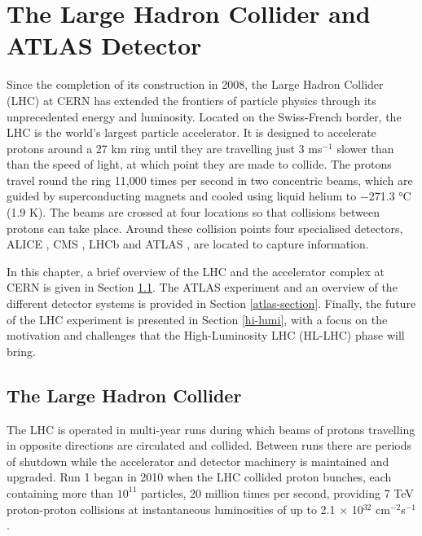 \graphicspath{{\subfix{../images/}}}
\doublespacing

\chapter{The Large Hadron Collider and ATLAS Detector}
\label{chapter-2}

Since the completion of its construction in 2008, the Large Hadron Collider (LHC)\cite{Evans:2008zzb} at CERN has extended the frontiers of particle physics through its unprecedented energy and luminosity. Located on the Swiss-French border, the LHC is the world’s largest particle accelerator. It is designed to accelerate protons around a 27 km ring until they are travelling just 3 ms$^{-1}$ slower than than the speed of light, at which point they are made to collide. The protons travel round the ring 11,000 times per second in two concentric beams, which are guided by superconducting magnets and cooled using liquid helium to \num{-271.3} \si{\degree}C (1.9 K). The beams are crossed at four locations so that collisions between protons can take place. Around these collision points four specialised detectors, ALICE \cite{AliceCollaboration_2008}, CMS \cite{CMS-TDR-08-001}, LHCb \cite{LHCbCollaboration_2008} and ATLAS \cite{PERF-2007-01}, are located to capture information.

In this chapter, a brief overview of the LHC and the accelerator complex at CERN is given in Section \ref{the-lhc}. The ATLAS experiment and an overview of the different detector systems is provided in Section \ref{atlas-section}. Finally, the future of the LHC experiment is presented in Section \ref{hi-lumi}, with a focus on the motivation and challenges that the High-Luminosity LHC (HL-LHC) phase will bring.


\section{The Large Hadron Collider}
\label{the-lhc}
The LHC is operated in multi-year runs during which beams of protons travelling in opposite directions are circulated and collided. Between runs there are periods of shutdown while the accelerator and detector machinery is maintained and upgraded. Run 1 began in 2010 when the LHC collided proton bunches, each containing more than $10^{11}$ particles, 20 million times per second, providing 7 TeV proton-proton collisions at instantaneous luminosities of up to 2.1 $\times$ 10$^{32}$ cm$^{−2}$s$^{−1}$.

